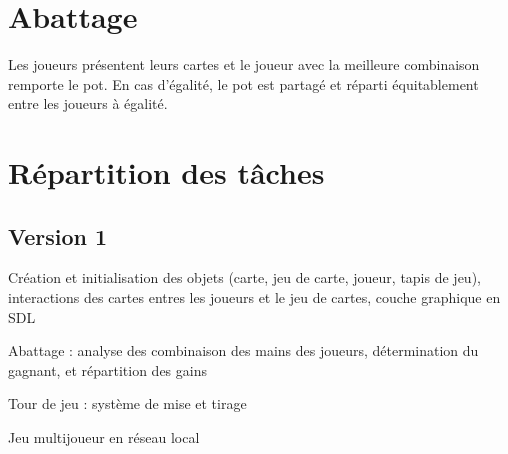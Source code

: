 \documentclass[12pt,a4paper]{article}
\begin{document}
\section{Abattage}
Les joueurs présentent leurs cartes et le joueur avec la meilleure combinaison remporte le pot. En cas d'égalité, le pot est partagé et réparti équitablement entre les joueurs à égalité.
\section{Répartition des tâches}
\subsection{Version 1}
\begin{description}
\item[Romain : ]{Création et initialisation des objets (carte, jeu de carte, joueur, tapis de jeu), interactions des cartes entres les joueurs et le jeu de cartes, couche graphique en SDL}
\item[Tristan : ]{Abattage : analyse des combinaison des mains des joueurs, détermination du gagnant, et répartition des gains}
\item[William :]  {Tour de jeu : système de mise et tirage}
\item
\item[OPTIONEL : ]{Jeu multijoueur en réseau local}


\end{description}
\end{document}
